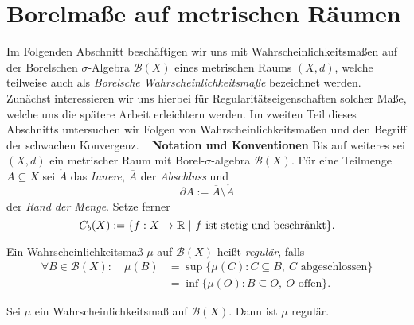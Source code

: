 \section{Borelmaße auf metrischen Räumen}
Im Folgenden Abschnitt beschäftigen wir uns mit Wahrscheinlichkeitsmaßen auf der Borelschen $\sigma$-Algebra $\mathcal{B}(X)$ eines metrischen Raums $(X,d)$, 
welche teilweise auch als \textit{Borelsche Wahrscheinlichkeitsmaße} bezeichnet werden. 
Zunächst interessieren wir uns hierbei für Regularitätseigenschaften solcher Maße, welche uns die spätere Arbeit erleichtern werden. 
Im zweiten Teil dieses Abschnitts untersuchen wir Folgen von Wahrscheinlichkeitsmaßen und den Begriff der schwachen Konvergenz. 
\newline \ \newline 
\textbf{Notation und Konventionen} 
\newline
Bis auf weiteres sei $(X,d)$ ein metrischer Raum mit Borel-$\sigma$-algebra $\mathcal{B}(X)$. 
Für eine Teilmenge $A \subseteq X$ sei $\mathring{A}$ das \textit{Innere}, $\overline{A}$ der \textit{Abschluss} und 
$$
    \partial A := \overline{A} \setminus \mathring{A}
$$
der \textit{Rand der Menge}. 
Setze ferner 
$$
    C_b(X) := \{f:X \to \mathbb{R} \ | \ f \text{ ist stetig und beschränkt} \}.
$$ 

\begin{mydef}
    Ein Wahrscheinlichkeitsmaß $\mu$ auf $\mathcal{B}(X)$ heißt \textit{regulär}, falls
    \begin{align*}
        \forall B \in \mathcal{B}(X): \quad \mu(B) &= \sup\{\mu(C): C \subseteq B, \ C \text{ abgeschlossen} \} \\\
                                                   &= \inf\{\mu(O): B \subseteq O, \ O \text{ offen} \}.  
    \end{align*}  
\end{mydef}

\begin{proposition}
    Sei $\mu$ ein Wahrscheinlichkeitsmaß auf $\mathcal{B}(X)$. Dann ist $\mu$ regulär. 
\end{proposition}

